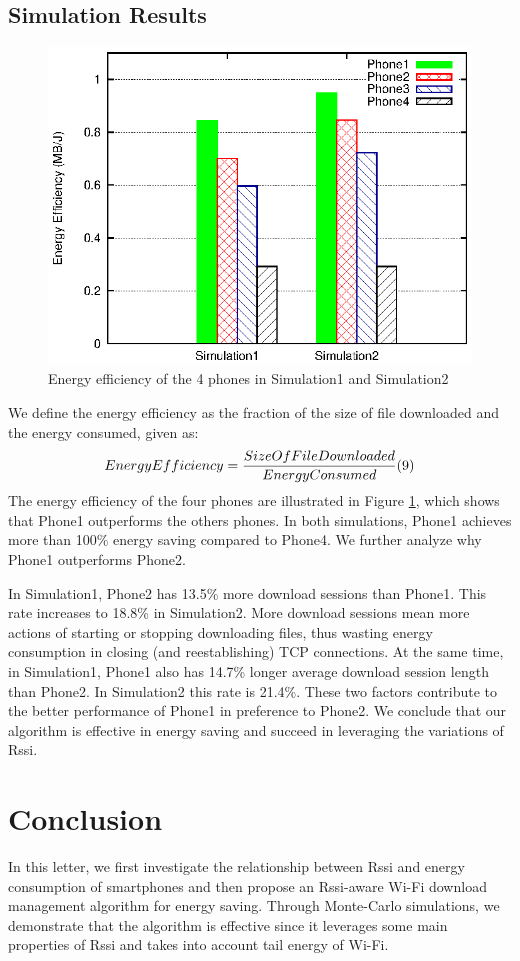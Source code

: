 \documentclass[journal]{IEEEtran}
\begin{document}
\subsection{Simulation Results}
\begin{figure}
\centering
\includegraphics[scale=0.85]{energy_efficiency.eps}
\caption{Energy efficiency of the 4 phones in Simulation1 and Simulation2}
\label{energy_efficiency}
\end{figure}
We define the energy efficiency as 
the fraction of the size of file downloaded and the energy consumed, given as:
$$ 
EnergyEfficiency = \frac{SizeOfFileDownloaded}{EnergyConsumed}	
\relax(9)
$$
The energy efficiency of the four phones are illustrated in Figure \ref{energy_efficiency},
which shows that Phone1 outperforms the others phones.
In both simulations, Phone1 achieves more than 100\% energy saving compared to 
Phone4.
We further analyze why Phone1 outperforms Phone2.

In Simulation1, 
Phone2 has 13.5\% more download sessions than Phone1. This rate increases to 18.8\% in Simulation2. More download sessions
mean more actions of starting or stopping downloading files, thus wasting energy consumption in 
closing (and reestablishing) TCP connections. 
At the same time, in Simulation1, Phone1 also has 14.7\% longer average download session length than Phone2. 
In Simulation2 this rate is 21.4\%. 
These two factors contribute to the better performance of Phone1 in preference to Phone2.
We conclude that our algorithm is effective in energy saving and succeed in 
leveraging the variations of Rssi.

\section{Conclusion} 
In this letter, we first investigate the relationship between Rssi and energy consumption of smartphones
and then propose an Rssi-aware Wi-Fi download management algorithm for energy saving.
Through Monte-Carlo simulations, we demonstrate that the algorithm is effective 
since it leverages some main properties of Rssi and takes into account
tail energy of Wi-Fi. 
\end{document}
